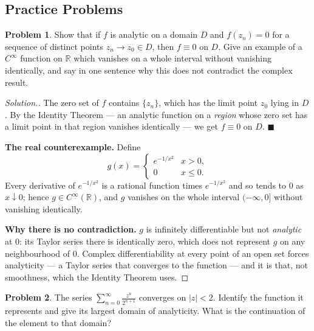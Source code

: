 \documentclass[11pt,a4paper]{article}
\theoremstyle{definition}
\newtheorem{problemx}{Problem}[section]
\newenvironment{problem}{\begin{problemx}}{\end{problemx}}
\newenvironment{solution}
  {\renewcommand{\qedsymbol}{}\begin{proof}[\textit{Solution}.]}
  {\end{proof}}
\begin{document}
{\color[wave]{485}\subsection{Practice Problems}}

\begin{problem}
Show that if $f$ is analytic on a domain $D$ and $f(z_n) = 0$ for a sequence of
distinct points $z_n \rightarrow z_0 \in D$, then $f \equiv 0$ on $D$. Give an
example of a $C^{\infty}$ function on $\mathbb{R}$ which vanishes on a whole
interval without vanishing identically, and say in one sentence why this does not
contradict the complex result.
\end{problem}

\begin{solution}
The zero set of $f$ contains $\{z_n\}$, which has the limit point $z_0$ lying in
$D$. By the Identity Theorem --- an analytic function on a \emph{region} whose zero
set has a limit point in that region vanishes identically --- we get $f \equiv 0$ on
$D$. $\blacksquare$

\textbf{The real counterexample.} Define
$$g(x) = \begin{cases}
e^{-1/x^{2}} & x > 0,\\
0 & x \leq 0 .
\end{cases}$$
Every derivative of $e^{-1/x^{2}}$ is a rational function times $e^{-1/x^{2}}$ and
so tends to $0$ as $x \downarrow 0$; hence $g \in C^{\infty}(\mathbb{R})$, and $g$
vanishes on the whole interval $(-\infty,0]$ without vanishing identically.

\textbf{Why there is no contradiction.} $g$ is infinitely differentiable but not
\emph{analytic} at $0$: its Taylor series there is identically zero, which does not
represent $g$ on any neighbourhood of $0$. Complex differentiability at every point
of an open set forces analyticity --- a Taylor series that converges to the function
--- and it is that, not smoothness, which the Identity Theorem uses.
\end{solution}


\begin{problem}
The series $\displaystyle\sum^{\infty}_{n = 0}\frac{z^n}{2^{n+1}}$ converges on
$\left|z\right| < 2$. Identify the function it represents and give its largest
domain of analyticity. What is the continuation of the element to that domain?
\end{problem}
\end{document}
